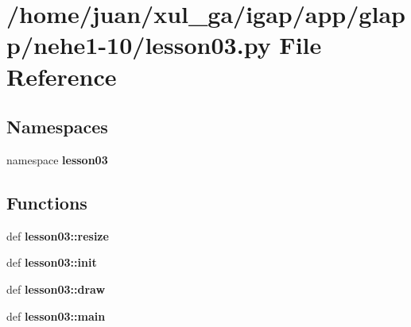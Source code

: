 \section{/home/juan/xul\_\-ga/igap/app/glapp/nehe1-10/lesson03.py File Reference}
\label{nehe1-10_2lesson03_8py}
\subsection*{Namespaces}
\begin{CompactItemize}
\item 
namespace {\bf lesson03}
\end{CompactItemize}
\subsection*{Functions}
\begin{CompactItemize}
\item 
def {\bf lesson03::resize}
\item 
def {\bf lesson03::init}
\item 
def {\bf lesson03::draw}
\item 
def {\bf lesson03::main}
\end{CompactItemize}
